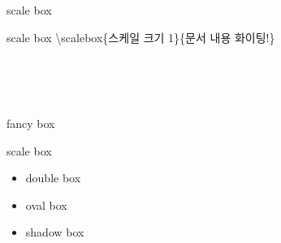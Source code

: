 \documentclass[ aspectratio=149,  10pt,blue,xcolor=pdftex,dvipsnames,table,handout,notes]{beamer}
\begin{document}
		\begin{frame}[t]{scale box}


			\begin{block} {scale box}
			\textbackslash scalebox\{스케일 크기 1\}\{문서 내용 화이팅!\}
			\end{block}

			\begin{example}
		\scalebox{1}{화이팅!}\\
		\scalebox{2}{화이팅!}\\
		\scalebox{3}{화이팅!}\\
			\end{example}


		\note[item]{}
		\end{frame}

		\begin{frame}[t]{fancy box}

			\begin{block} {scale box}
				\begin{itemize}
				\item double box
				\item oval box
				\item shadow box
				\end{itemize}
			\end{block}




		\note[item]{}
		\end{frame}
\end{document}
